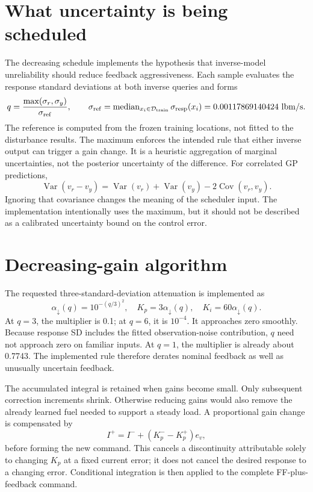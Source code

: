 \documentclass[11pt,a4paper,oneside]{report}
\begin{document}
\section{What uncertainty is being scheduled}
The decreasing schedule implements the hypothesis that inverse-model unreliability should reduce feedback aggressiveness. Each sample evaluates the response standard deviations at both inverse queries and forms
\begin{equation}
q=\frac{\max(\sigma_r,\sigma_y)}{\sigma_{\rm ref}},\qquad
\sigma_{\rm ref}=\operatorname{median}_{x_i\in\mathcal D_{\rm train}}\sigma_{\rm resp}(x_i)
=0.00117869140424\ \mathrm{lbm/s}.
\end{equation}
The reference is computed from the frozen training locations, not fitted to the disturbance results. The maximum enforces the intended rule that either inverse output can trigger a gain change. It is a heuristic aggregation of marginal uncertainties, not the posterior uncertainty of the difference. For correlated GP predictions,
\begin{equation}
\operatorname{Var}(v_r-v_y)=\operatorname{Var}(v_r)+\operatorname{Var}(v_y)-2\operatorname{Cov}(v_r,v_y).
\end{equation}
Ignoring that covariance changes the meaning of the scheduler input. The implementation intentionally uses the maximum, but it should not be described as a calibrated uncertainty bound on the control error.

\section{Decreasing-gain algorithm}
The requested three-standard-deviation attenuation is implemented as
\begin{equation}
\alpha_\downarrow(q)=10^{-(q/3)^2},\quad
K_p=3\alpha_\downarrow(q),\quad K_i=60\alpha_\downarrow(q).
\label{eq:down}
\end{equation}
At $q=3$, the multiplier is 0.1; at $q=6$, it is $10^{-4}$. It approaches zero smoothly. Because response SD includes the fitted observation-noise contribution, $q$ need not approach zero on familiar inputs. At $q=1$, the multiplier is already about 0.7743. The implemented rule therefore derates nominal feedback as well as unusually uncertain feedback.

The accumulated integral is retained when gains become small. Only subsequent correction increments shrink. Otherwise reducing gains would also remove the already learned fuel needed to support a steady load. A proportional gain change is compensated by
\begin{equation}
I^{+}=I^{-}+(K_p^{-}-K_p^{+})e_v,
\end{equation}
before forming the new command. This cancels a discontinuity attributable solely to changing $K_p$ at a fixed current error; it does not cancel the desired response to a changing error. Conditional integration is then applied to the complete FF-plus-feedback command.
\end{document}
